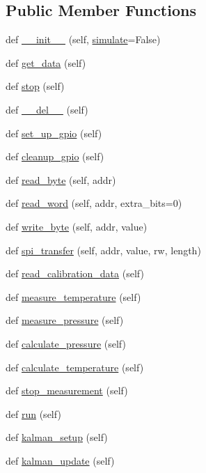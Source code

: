 \subsection*{Public Member Functions}
\begin{DoxyCompactItemize}
\item 
def \hyperlink{classbmp183_1_1bmp183_abff9456bd2e262738b3d2bc8d75fb931}{\+\_\+\+\_\+init\+\_\+\+\_\+} (self, \hyperlink{classbmp183_1_1bmp183_af2e228fbb767e51461bc3b906c95e08a}{simulate}=False)
\item 
def \hyperlink{classbmp183_1_1bmp183_a5e6acda0bca8df5d68f673959a75023a}{get\+\_\+data} (self)
\item 
def \hyperlink{classbmp183_1_1bmp183_aa95ba9d2ee3ea621fa744e0084929065}{stop} (self)
\item 
def \hyperlink{classbmp183_1_1bmp183_a07d23f8009ce9777dfe09ae86520d090}{\+\_\+\+\_\+del\+\_\+\+\_\+} (self)
\item 
def \hyperlink{classbmp183_1_1bmp183_ac97968b3dac366872efb1c35a0075894}{set\+\_\+up\+\_\+gpio} (self)
\item 
def \hyperlink{classbmp183_1_1bmp183_a7c318f9ad88f503eef530c5eb0bec53f}{cleanup\+\_\+gpio} (self)
\item 
def \hyperlink{classbmp183_1_1bmp183_aebeb011deb88334ca6117f9c2c1e6a25}{read\+\_\+byte} (self, addr)
\item 
def \hyperlink{classbmp183_1_1bmp183_acb489a2b4069a82181778661ab03a253}{read\+\_\+word} (self, addr, extra\+\_\+bits=0)
\item 
def \hyperlink{classbmp183_1_1bmp183_a3a1505772511584be7c7c520d6401510}{write\+\_\+byte} (self, addr, value)
\item 
def \hyperlink{classbmp183_1_1bmp183_aa9f341ec4f04763a41fa286a5e63ca25}{spi\+\_\+transfer} (self, addr, value, rw, length)
\item 
def \hyperlink{classbmp183_1_1bmp183_a62162d8715be0b61e81e36ebcefb2a6c}{read\+\_\+calibration\+\_\+data} (self)
\item 
def \hyperlink{classbmp183_1_1bmp183_aa22da0e9cc7ec3fad2a4df816dc29f27}{measure\+\_\+temperature} (self)
\item 
def \hyperlink{classbmp183_1_1bmp183_ae2cd9be902c9da687f3cb80b6d041a21}{measure\+\_\+pressure} (self)
\item 
def \hyperlink{classbmp183_1_1bmp183_ad3925b2b055181dde2f192861dc1214f}{calculate\+\_\+pressure} (self)
\item 
def \hyperlink{classbmp183_1_1bmp183_ae9ff54fa23b6657aaf46acb662a8a1fc}{calculate\+\_\+temperature} (self)
\item 
def \hyperlink{classbmp183_1_1bmp183_aabd7c1509c165bdb1433b3dcb4540da0}{stop\+\_\+measurement} (self)
\item 
def \hyperlink{classbmp183_1_1bmp183_a1cd6a20d6910bd850cd98df4c0ddb7d7}{run} (self)
\item 
def \hyperlink{classbmp183_1_1bmp183_a5eecb87615765a4614e670fbd8b3d015}{kalman\+\_\+setup} (self)
\item 
def \hyperlink{classbmp183_1_1bmp183_a97339b46ef50f4f8d870bdb84dcdea2e}{kalman\+\_\+update} (self)
\end{DoxyCompactItemize}
